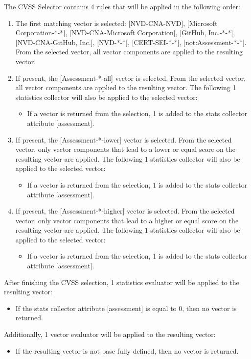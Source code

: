 \noindent The CVSS Selector contains 4 rules that will be applied in the following order:
\begin{enumerate}[noitemsep]
    \item The first matching vector is selected: [NVD-CNA-NVD], [Microsoft Corporation-*-*], [NVD-CNA-Microsoft Corporation], [GitHub, Inc.-*-*], [NVD-CNA-GitHub, Inc.], [NVD-*-*], [CERT-SEI-*-*], [not:Assessment-*-*]. From the selected vector, all vector components are applied to the resulting vector.
    \item If present, the [Assessment-*-all] vector is selected. From the selected vector, all vector components are applied to the resulting vector. The following 1 statistics collector will also be applied to the selected vector:
    \begin{itemize}[noitemsep]
        \item If a vector is returned from the selection, 1 is added to the stats collector attribute [assessment].
    \end{itemize}
    \item If present, the [Assessment-*-lower] vector is selected. From the selected vector, only vector components that lead to a lower or equal score on the resulting vector are applied. The following 1 statistics collector will also be applied to the selected vector:
    \begin{itemize}[noitemsep]
        \item If a vector is returned from the selection, 1 is added to the stats collector attribute [assessment].
    \end{itemize}
    \item If present, the [Assessment-*-higher] vector is selected. From the selected vector, only vector components that lead to a higher or equal score on the resulting vector are applied. The following 1 statistics collector will also be applied to the selected vector:
    \begin{itemize}[noitemsep]
        \item If a vector is returned from the selection, 1 is added to the stats collector attribute [assessment].
    \end{itemize}
\end{enumerate}

\noindent After finishing the CVSS selection, 1 statistics evaluator will be applied to the resulting vector:
\begin{itemize}[noitemsep]
    \item If the stats collector attribute [assessment] is equal to 0, then no vector is returned.
\end{itemize}
Additionally, 1 vector evaluator will be applied to the resulting vector:
\begin{itemize}[noitemsep]
    \item If the resulting vector is not base fully defined, then no vector is returned.
\end{itemize}

